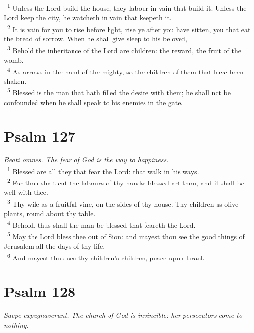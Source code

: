 \documentclass[a5paper,12pt]{article}
\begin{document}
\begin{multicols*}{2}
~\textsuperscript{1} Unless the Lord build the house, they labour in vain that build it. Unless the Lord keep the city, he watcheth in vain that keepeth it.\\
~\textsuperscript{2} It is vain for you to rise before light, rise ye after you have sitten, you that eat the bread of sorrow. When he shall give sleep to his beloved,\\
~\textsuperscript{3} Behold the inheritance of the Lord are children: the reward, the fruit of the womb.\\
~\textsuperscript{4} As arrows in the hand of the mighty, so the children of them that have been shaken.\\
~\textsuperscript{5} Blessed is the man that hath filled the desire with them; he shall not be confounded when he shall speak to his enemies in the gate.\\

\section{Psalm 127}
\label{sec:org36beff1}
\emph{Beati omnes. The fear of God is the way to happiness.}\\

~\textsuperscript{1} Blessed are all they that fear the Lord: that walk in his ways.\\
~\textsuperscript{2} For thou shalt eat the labours of thy hands: blessed art thou, and it shall be well with thee.\\
~\textsuperscript{3} Thy wife as a fruitful vine, on the sides of thy house. Thy children as olive plants, round about thy table.\\
~\textsuperscript{4} Behold, thus shall the man be blessed that feareth the Lord.\\
~\textsuperscript{5} May the Lord bless thee out of Sion: and mayest thou see the good things of Jerusalem all the days of thy life.\\
~\textsuperscript{6} And mayest thou see thy children's children, peace upon Israel.\\

\section{Psalm 128}
\label{sec:org652af03}
\emph{Saepe expugnaverunt. The church of God is invincible: her persecutors come to nothing.}\\


\end{multicols*}
\end{document}
